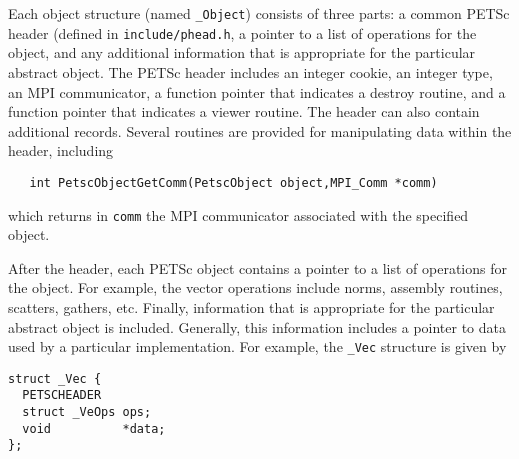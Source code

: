Each object structure (named {\tt \_Object}) consists of three parts:
a common PETSc header (defined in {\tt include/phead.h},
a pointer to a list of operations for the
object, and any additional information that is appropriate for the
particular abstract object.  The PETSc header includes an integer
cookie, an integer type, an MPI communicator, a function pointer that
indicates a destroy routine, and a function pointer that indicates a
viewer routine. The header can also contain additional records.
Several routines are provided for manipulating data within the header,
including
\begin{verbatim}
   int PetscObjectGetComm(PetscObject object,MPI_Comm *comm) 
\end{verbatim}
which returns in {\tt comm} 
 the MPI communicator associated with the
specified object.

After the header, each PETSc object contains a pointer to a list of
operations for the object.  For example, the vector operations include
norms, assembly routines, scatters, gathers, etc.  Finally,
information that is appropriate for the particular abstract object is
included. Generally, this information includes a pointer to data used
by a particular implementation.  For example, the {\tt \_Vec}
structure is given by
\begin{verbatim}
struct _Vec {
  PETSCHEADER
  struct _VeOps ops;
  void          *data;
};
\end{verbatim}

